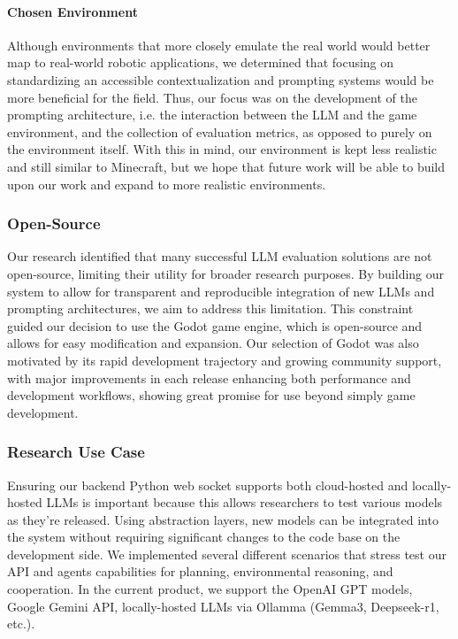 \documentclass{article}
\begin{document}
\paragraph{Chosen Environment} Although environments that more closely emulate the real world would better map to real-world robotic applications, we determined that focusing on standardizing an accessible contextualization and prompting systems would be more beneficial for the field.
Thus, our focus was on the development of the prompting architecture, i.e. the interaction between the LLM and the game environment, and the collection of evaluation metrics, as opposed to purely on the environment itself.
With this in mind, our environment is kept less realistic and still similar to Minecraft, but we hope that future work will be able to build upon our work and expand to more realistic environments.

\subsubsection{Open-Source}
Our research identified that many successful LLM evaluation solutions are not open-source, limiting their utility for broader research purposes.
By building our system to allow for transparent and reproducible integration of new LLMs and prompting architectures, we aim to address this limitation.
This constraint guided our decision to use the Godot game engine, which is open-source and allows for easy modification and expansion.
Our selection of Godot was also motivated by its rapid development trajectory and growing community support, with major improvements in each release enhancing both performance and development workflows, showing great promise for use beyond simply game development.

\subsubsection{Research Use Case}
Ensuring our backend Python web socket supports both cloud-hosted and locally-hosted LLMs is important because this allows researchers to test various models as they're released.
Using abstraction layers, new models can be integrated into the system without requiring significant changes to the code base on the development side.
We implemented several different scenarios that stress test our API and agents capabilities for planning, environmental reasoning, and cooperation.
In the current product, we support the OpenAI GPT models, Google Gemini API, locally-hosted LLMs via Ollamma (Gemma3, Deepseek-r1, etc.).
\end{document}
